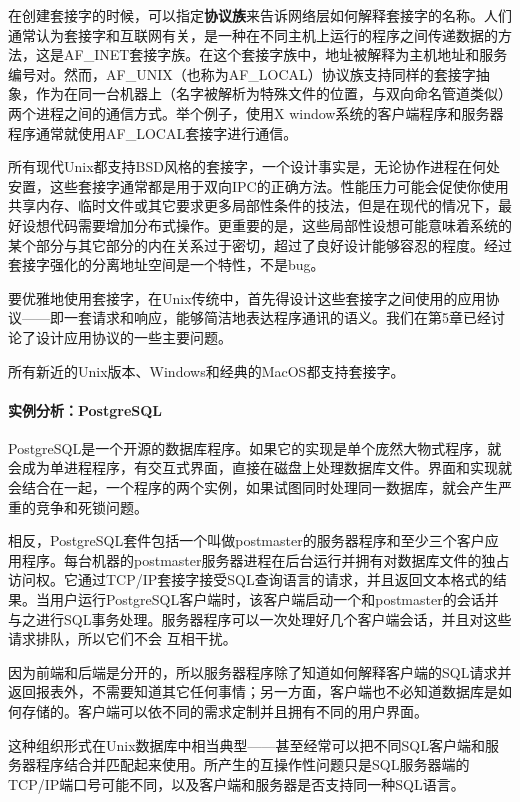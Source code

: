 \documentclass[12pt,oneside]{ctexbook}
\begin{document}
\begin{common-format}
在创建套接字的时候，可以指定\textbf{协议族}来告诉网络层如何解释套接字的名称。人们通常认为套接字和互联网有关，是一种在不同主机上运行的程序之间传递数据的方法，这是AF\_{}INET套接字族。在这个套接字族中，地址被解释为主机地址和服务编号对。然而，AF\_{}UNIX（也称为AF\_{}LOCAL）协议族支持同样的套接字抽象，作为在同一台机器上（名字被解析为特殊文件的位置，与双向命名管道类似）两个进程之间的通信方式。举个例子，使用X window系统的客户端程序和服务器程序通常就使用AF\_{}LOCAL套接字进行通信。

所有现代Unix都支持BSD风格的套接字，一个设计事实是，无论协作进程在何处安置，这些套接字通常都是用于双向IPC的正确方法。性能压力可能会促使你使用共享内存、临时文件或其它要求更多局部性条件的技法，但是在现代的情况下，最好设想代码需要增加分布式操作。更重要的是，这些局部性设想可能意味着系统的某个部分与其它部分的内在关系过于密切，超过了良好设计能够容忍的程度。经过套接字强化的分离地址空间是一个特性，不是bug。

要优雅地使用套接字，在Unix传统中，首先得设计这些套接字之间使用的应用协议——即一套请求和响应，能够简洁地表达程序通讯的语义。我们在第5章已经讨论了设计应用协议的一些主要问题。

所有新近的Unix版本、Windows和经典的MacOS都支持套接字。


\paragraph{实例分析：PostgreSQL}
PostgreSQL是一个开源的数据库程序。如果它的实现是单个庞然大物式程序，就会成为单进程程序，有交互式界面，直接在磁盘上处理数据库文件。界面和实现就会结合在一起，一个程序的两个实例，如果试图同时处理同一数据库，就会产生严重的竞争和死锁问题。

相反，PostgreSQL套件包括一个叫做postmaster的服务器程序和至少三个客户应用程序。每台机器的postmaster服务器进程在后台运行并拥有对数据库文件的独占访问权。它通过TCP/IP套接字接受SQL查询语言的请求，并且返回文本格式的结果。当用户运行PostgreSQL客户端时，该客户端启动一个和postmaster的会话并与之进行SQL事务处理。服务器程序可以一次处理好几个客户端会话，并且对这些请求排队，所以它们不会
互相干扰。

因为前端和后端是分开的，所以服务器程序除了知道如何解释客户端的SQL请求并返回报表外，不需要知道其它任何事情；另一方面，客户端也不必知道数据库是如何存储的。客户端可以依不同的需求定制并且拥有不同的用户界面。

这种组织形式在Unix数据库中相当典型——甚至经常可以把不同SQL客户端和服务器程序结合并匹配起来使用。所产生的互操作性问题只是SQL服务器端的TCP/IP端口号可能不同，以及客户端和服务器是否支持同一种SQL语言。



\end{common-format}
\end{document}
